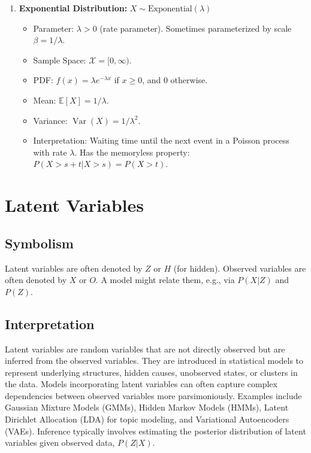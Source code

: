 \documentclass{article}
\newcommand{\E}{\mathbb{E}}    %
\DeclareMathOperator{\Var}{Var} %
\begin{document}
\begin{enumerate}
    \item \textbf{Exponential Distribution:} $X \sim \text{Exponential}(\lambda)$
        \begin{itemize}
            \item Parameter: $\lambda > 0$ (rate parameter). Sometimes parameterized by scale $\beta=1/\lambda$.
            \item Sample Space: $\mathcal{X} = [0, \infty)$.
            \item PDF: $f(x) = \lambda e^{-\lambda x}$ if $x \ge 0$, and $0$ otherwise.
            \item Mean: $\E[X] = 1/\lambda$.
            \item Variance: $\Var(X) = 1/\lambda^2$.
            \item Interpretation: Waiting time until the next event in a Poisson process with rate $\lambda$. Has the memoryless property: $P(X > s+t | X > s) = P(X > t)$.
        \end{itemize}
\end{enumerate}

\section{Latent Variables}

\subsection*{Symbolism}
Latent variables are often denoted by $Z$ or $H$ (for hidden). Observed variables are often denoted by $X$ or $O$. A model might relate them, e.g., via $P(X|Z)$ and $P(Z)$.

\subsection*{Interpretation}
Latent variables are random variables that are not directly observed but are inferred from the observed variables. They are introduced in statistical models to represent underlying structures, hidden causes, unobserved states, or clusters in the data. Models incorporating latent variables can often capture complex dependencies between observed variables more parsimoniously. Examples include Gaussian Mixture Models (GMMs), Hidden Markov Models (HMMs), Latent Dirichlet Allocation (LDA) for topic modeling, and Variational Autoencoders (VAEs). Inference typically involves estimating the posterior distribution of latent variables given observed data, $P(Z|X)$.
\end{document}
